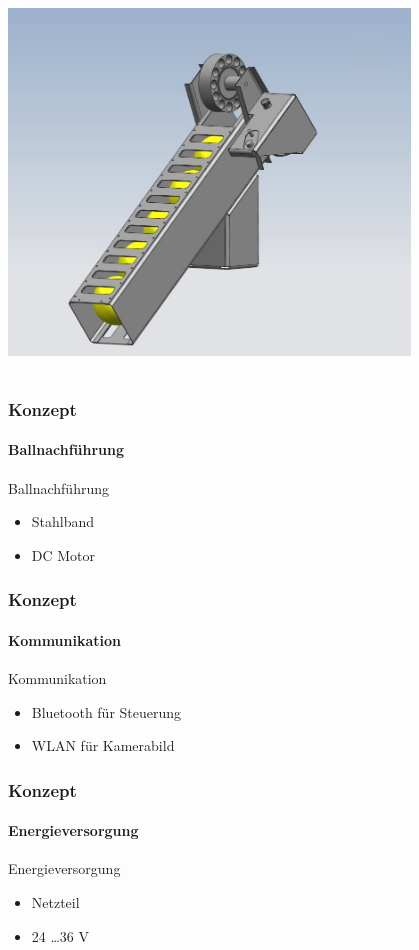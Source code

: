 \begin{frame}
\begin{columns}
\begin{column}{0.6\textwidth}
            \includegraphics[width=0.8\textwidth, trim = 40mm 0mm 60mm 30mm, clip]{../doc/fig/Balllager.jpg}
        \end{column}
    \end{columns}
\end{frame}

\begin{frame}
    \frametitle{Konzept}
    \framesubtitle{Ballnachführung}
    \begin{block}{Ballnachführung}
        \begin{itemize}
            \item Stahlband
            \item DC Motor
        \end{itemize}
    \end{block}
\end{frame}

\begin{frame}
    \frametitle{Konzept}
    \framesubtitle{Kommunikation}
    \begin{block}{Kommunikation}
        \begin{itemize}
            \item Bluetooth für Steuerung
            \item WLAN für Kamerabild
        \end{itemize}
    \end{block}
\end{frame}

\begin{frame}
    \frametitle{Konzept}
    \framesubtitle{Energieversorgung}
    \begin{block}{Energieversorgung}
        \begin{itemize}
            \item Netzteil
            \item 24 \ldots 36 V
        \end{itemize}
    \end{block}
\end{frame}

